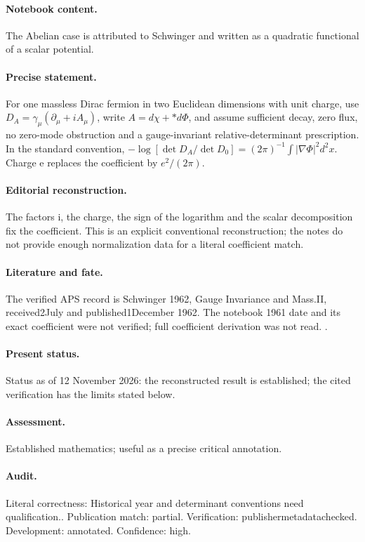 \paragraph{Notebook content.} The Abelian case is attributed to Schwinger and written as a quadratic functional of a scalar potential.

\paragraph{Precise statement.} For one massless Dirac fermion in two Euclidean dimensions with unit charge, use $D_A=\gamma_\mu(\partial_\mu+iA_\mu)$, write $A=d\chi+*d\Phi$, and assume sufficient decay, zero flux, no zero-mode obstruction and a gauge-invariant relative-determinant prescription. In the standard convention, $-\log[\det D_A/\det D_0]=(2\pi)^{-1}\int|\nabla\Phi|^2d^2x$. Charge e replaces the coefficient by $e^2/(2\pi)$.

\paragraph{Editorial reconstruction.} The factors i, the charge, the sign of the logarithm and the scalar decomposition fix the coefficient. This is an explicit conventional reconstruction; the notes do not provide enough normalization data for a literal coefficient match.

\paragraph{Literature and fate.} The verified APS record is Schwinger 1962, Gauge Invariance and Mass.II, received2July and published1December 1962. The notebook 1961 date and its exact coefficient were not verified; full coefficient derivation was not read. \citep{schwinger1962gauge}.

\paragraph{Present status.} Status as of 12 November 2026: the reconstructed result is established; the cited verification has the limits stated below.

\paragraph{Assessment.} Established mathematics; useful as a precise critical annotation.

\paragraph{Audit.} Literal correctness: Historical year and determinant conventions need qualification.. Publication match: partial. Verification: publishermetadatachecked. Development: annotated. Confidence: high.


